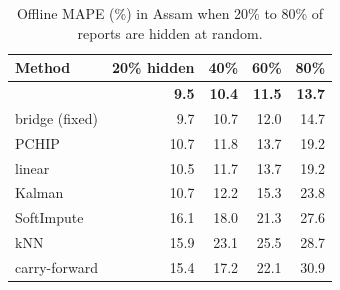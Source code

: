 \begin{table}[tbp]
\caption{Offline MAPE (\%) in Assam when 20\% to 80\% of reports are hidden at random.}
\label{tab:missing}
\small
\begin{tabular}{lrrrr}
\toprule
Method & 20\% hidden & 40\% & 60\% & 80\% \\
\midrule
\auto{} & \textbf{9.5} & \textbf{10.4} & \textbf{11.5} & \textbf{13.7} \\
bridge (fixed) & 9.7 & 10.7 & 12.0 & 14.7 \\
PCHIP & 10.7 & 11.8 & 13.7 & 19.2 \\
linear & 10.5 & 11.7 & 13.7 & 19.2 \\
Kalman & 10.7 & 12.2 & 15.3 & 23.8 \\
SoftImpute & 16.1 & 18.0 & 21.3 & 27.6 \\
kNN & 15.9 & 23.1 & 25.5 & 28.7 \\
carry-forward & 15.4 & 17.2 & 22.1 & 30.9 \\
\bottomrule
\end{tabular}
\end{table}
